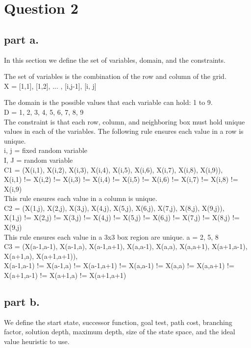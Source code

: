 \section{Question 2}

\subsection{part a.}
In this section we define the set of variables, domain, and the constraints.

The set of variables is the combination of the row and column of the grid. \\
X = {[1,1], [1,2], ... , [i,j-1], [i, j]}

The domain is the possible values that each variable can hold: 1 to 9.\\
D = {1, 2, 3, 4, 5, 6, 7, 8, 9} \\

The constraint is that each row, column, and neighboring box must hold unique values in each of the variables. The following rule ensures each value in a row is unique. \\
i, j = fixed random variable \\
I, J = random variable \\
C1 = {(X(i,1), X(i,2), X(i,3), X(i,4), X(i,5), X(i,6), X(i,7), X(i,8), X(i,9)),\\
	{X(i,1) != X(i,2) != X(i,3) != X(i,4) != X(i,5) != X(i,6) != X(i,7) != X(i,8) != X(i,9)}}\\


This rule ensures each value in a column is unique. \\
C2 = {(X(1,j), X(2,j), X(3,j), X(4,j), X(5,j), X(6,j), X(7,j), X(8,j), X(9,j)), \\
{X(1,j) != X(2,j) != X(3,j) != X(4,j) != X(5,j) != X(6,j) != X(7,j) != X(8,j) != X(9,j)}}\\



This rule ensures each value in a 3x3 box region are unique.
a = 2, 5, 8 \\
C3 = {(X(a-1,a-1), X(a-1,a), X(a-1,a+1), X(a,a-1), X(a,a), X(a,a+1), X(a+1,a-1), X(a+1,a), X(a+1,a+1)), \\
	{X(a-1,a-1) != X(a-1,a) != X(a-1,a+1) != X(a,a-1) != X(a,a) != X(a,a+1) != X(a+1,a-1) != X(a+1,a) != X(a+1,a+1)}}\\


\subsection{part b.}
We define the start state, successor function, goal test, path cost,  branching factor, solution depth, maximum depth, size of the state space, and the ideal value heuristic to use.

